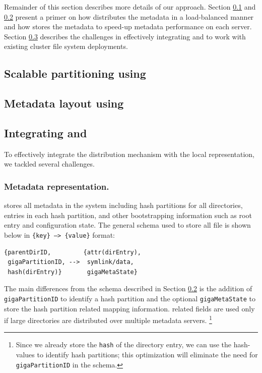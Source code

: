 Remainder of this section describes more details of our approach. 
Section \ref{design.giga} and \ref{design.tablefs} present a primer on how
\giga{} distributes the metadata in a load-balanced manner and how \tfs{}
stores the metadata to speed-up metadata performance on each server. 
Section \ref{design.integration} describes the challenges in effectively
integrating \giga{} and \tfs{} to work with existing cluster file system
deployments. 

\subsection{Scalable partitioning using \giga{}}
\label{design.giga}


\subsection{Metadata layout using \ldb{}}
\label{design.tablefs}


\subsection{Integrating \giga{} and \tfs{}}
\label{design.integration}

To effectively integrate the \giga{} distribution mechanism with the
\tfs{} local representation, we tackled several challenges. 

\subsubsection*{Metadata representation.}

\tfs{} stores all metadata in the system including \giga{} hash
partitions for all directories, entries in each hash partition, and other
bootstrapping information such as root entry and \giga{} configuration state.
The general schema used to store all file is shown below in
\texttt{\{key\} --> \{value\}} format:

\begin{verbatim}
{parentDirID,         {attr(dirEntry),
 gigaPartitionID, -->  symlink/data,
 hash(dirEntry)}       gigaMetaState}
\end{verbatim}

The main differences from the \tfs{} schema described in Section
\ref{design.tablefs} is the addition of \texttt{gigaPartitionID} to identify a
\giga{} hash partition and the optional \texttt{gigaMetaState} to store the
hash partition related mapping information. \giga{} related fields are used
only if large directories are distributed over multiple metadata servers.
\footnote{
Since we already store the \texttt{hash} of the directory entry, we can use the
hash-values to identify hash partitions; this optimization will eliminate the
need for \texttt{gigaPartitionID} in the schema.} 

